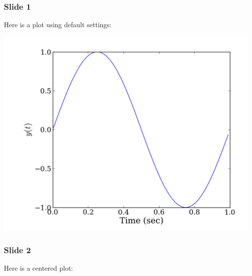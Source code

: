 \documentclass[t,english]{beamer}
\begin{document}
\begin{frame}[fragile]
\frametitle{Slide 1}


Here is a plot using default settings:

\includegraphics[height=0.75\textheight]{plot.png}
\end{frame}

\begin{frame}[fragile]
\frametitle{Slide 2}


Here is a centered plot:

\noindent{}
\end{frame}
\end{document}
